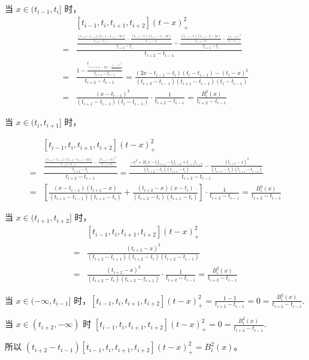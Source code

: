 \documentclass[lang=cn,a4paper,newtx,bibend=bibtex]{elegantpaper}
\begin{document}
\begin{solution}
当 $x\in (t_{i-1}, t_i]$ 时，
\begin{equation*}
\begin{aligned}
&[t_{i-1},t_i,t_{i+1},t_{i+2}](t-x)_+^2\\
=&\frac{
  \frac{
    \frac{(t_{i+2}-t_{i+1})(t_{i+2}-t_{i+1}-2x)}{t_{i+2}-t_{i+1}}
    -\frac{(t_{i+1}-t_{i})(t_{i+1}-t_{i}-2x)}{t_{i+1}-t_{i}}
  }{t_{i+2}-t_i}
  -
  \frac{
    \frac{(t_{i+1}-t_{i})(t_{i+1}-t_{i}-2x)}{t_{i+1}-t_{i}}
    -\frac{(t_i-x)^2}{t_{i}-t_{i-1}}
  }{t_{i+2}-t_i}
}{t_{i+2}-t_{i-1}} \\
=& \frac{1-\frac{t_{i+1+t_i-2x-\frac{(t_i-x)^2}{t_{i}-t_{i-1}}}}{t_{i+1}-t_{i-1}}}{t_{i+2}-t_{i-1}} 
=\frac{(2x-t_{i-1}-t_i)(t_i-t_{i-1})-(t_i-x)^2}{(t_{i+2}-t_{i-1})(t_{i+1}-t_{i-1})(t_i-t_{i-1})} \\
=& \frac{(x-t_{i-1})^2}{(t_{i+1}-t_{i-1})(t_i-t_{i-1})}\cdot \frac{1}{t_{i+2}-t_{i-1}} = \frac{B_i^2(x)}{t_{i+2}-t_{i-1}}
\end{aligned}
\end{equation*}

当 $x\in (t_{i}, t_{i+1}]$ 时，

\begin{equation*}
  \begin{aligned}
  &[t_{i-1},t_i,t_{i+1},t_{i+2}](t-x)_+^2\\
  =&\frac{
    \frac{
      \frac{(t_{i+2}-t_{i+1})(t_{i+2}-t_{i+1}-2x)}{t_{i+2}-t_{i+1}}
      -\frac{(t_{i+1}-x)^2}{t_{i+1}-t_{i}}
    }{t_{i+2}-t_i}
  }{t_{i+2}-t_{i-1}} 
  =\frac{\frac{-x^2+2t_ix-t_it_{i+1}-t_it_{i+2}+t_{i+1}t_{i+2}}{(t_{i+2}-t_i)(t_{i+1}-t_i)}-\frac{(t_{i+1}-x)^2}{(t_{i+1}-t_i)(t_{i+1}-t_{i-1})}}{t_{i+2}-t_{i-1}} \\
  =& \left[\frac{(x-t_{i-1})(t_{i+1}-x)}{(t_{i+1}-t_{i-1})(t_{i+1}-t_i)}+\frac{(t_{i+2}-x)(x-t_i)}{(t_{i+2}-t_{i})(t_{i+1}-t_{i})}\right] \cdot \frac{1}{t_{i+2}-t_{i-1}} = \frac{B_i^2(x)}{t_{i+2}-t_{i-1}}
  \end{aligned}
  \end{equation*}

当 $x\in (t_{i+1}, t_{i+2}]$ 时，
\begin{equation*}
  \begin{aligned}
    &[t_{i-1},t_i,t_{i+1},t_{i+2}](t-x)_+^2\\
    =&\frac{(t_{i+2}-x)^2}{(t_{i+2}-t_{i+1})(t_{i+2}-t_i)(t_{i+2}-t_{i-1})} \\
    =& \frac{(t_{i+2}-x)^2}{(t_{i+2}-t_{i})(t_{i+2}-t_{i+1})}\cdot \frac{1}{t_{i+2}-t_{i-1}} = \frac{B_i^2(x)}{t_{i+2}-t_{i-1}}
  \end{aligned}
\end{equation*}

当 $x\in (-\infty, t_{i-1}]$ 时，$[t_{i-1},t_i,t_{i+1},t_{i+2}](t-x)_+^2 = \frac{1-1}{t_{i+2}-t_{i-1}} = 0 = \frac{B_i^2(x)}{t_{i+2}-t_{i-1}}$.

当 $x\in (t_{i+2}, -\infty)$ 时 $[t_{i-1},t_i,t_{i+1},t_{i+2}](t-x)_+^2 = 0 = \frac{B_i^2(x)}{t_{i+2}-t_{i-1}}$.

所以 $(t_{i+2}-t_{i-1})[t_{i-1},t_i,t_{i+1},t_{i+2}](t-x)_+^2=B_i^2(x)$。
\end{solution}
\end{document}
